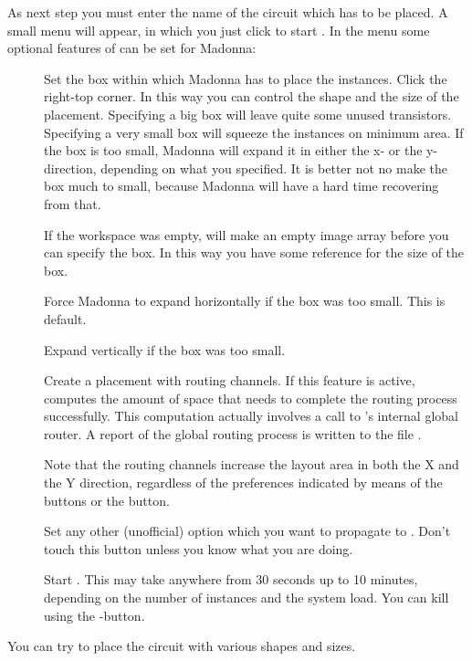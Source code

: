 As next step you must enter the name of the circuit which
has to be placed. A small menu will appear, in which you
just click  to start .
In the menu some optional features of can be set for Madonna:
\begin{description}
\item[]
Set the box within which Madonna has to place the instances.  Click the
right-top corner. In this way you can control the shape and the size of the
placement. Specifying a big box will leave quite some unused transistors.
Specifying a very small box will squeeze the instances on minimum area. If the
box is too small, Madonna will expand it in either the x- or the y-direction,
depending on what you specified. It is better not no make the box much to
small, because Madonna will have a hard time recovering from that.

If the workspace was empty,  will make an empty image array
before you can specify the box. In this way you have some reference for the
size of the box.
\item[]
Force Madonna to expand horizontally if the box was too small.
This is default.
\item[]
Expand vertically if the box was too small.
\item[]
Create a placement with routing channels. If this feature is active,
 computes the amount of space that  needs 
to complete the routing process successfully. This computation actually
involves a call to
's internal global router. A report of the global routing
process is written to the file .

Note that the routing channels increase the layout area in both the X and the Y
direction, regardless of the preferences indicated by means of the
 buttons or the  button.
\item[]
Set any other (unofficial) option which you want to propagate to
. Don't touch this button unless you know what you are
doing. 
\item[]
Start . This may take anywhere from 30 seconds up to
10 minutes, depending
on the number of instances and the system load. You can kill 
using the -button.
\end{description}
You can try to place the circuit with various shapes and sizes.

